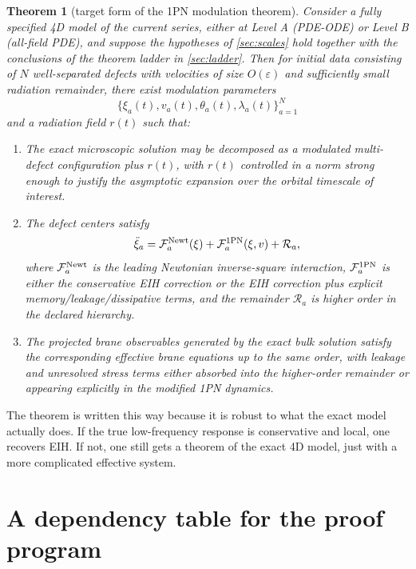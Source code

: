 \documentclass[11pt]{article}
\newcommand{\eps}{\varepsilon}
\newtheorem{theorem}{Theorem}
\begin{document}
\begin{theorem}[target form of the 1PN modulation theorem]
Consider a fully specified 4D model of the current series, either at Level A (PDE-ODE) or Level B (all-field PDE), and suppose the hypotheses of \cref{sec:scales} hold together with the conclusions of the theorem ladder in \cref{sec:ladder}. Then for initial data consisting of $N$ well-separated defects with velocities of size $O(\eps)$ and sufficiently small radiation remainder, there exist modulation parameters
\begin{equation}
  \{\xi_{a}(t),v_{a}(t),\theta_{a}(t),\lambda_{a}(t)\}_{a=1}^{N}
\end{equation}
and a radiation field $r(t)$ such that:
\begin{enumerate}[leftmargin=1.5em]
  \item The exact microscopic solution may be decomposed as a modulated multi-defect configuration plus $r(t)$, with $r(t)$ controlled in a norm strong enough to justify the asymptotic expansion over the orbital timescale of interest.
  \item The defect centers satisfy
  \begin{equation}
    \ddot\xi_{a}=\mathcal F^{\rm Newt}_{a}(\xi)+\mathcal F^{\rm 1PN}_{a}(\xi,v)+\mathcal R_{a},
  \end{equation}
  where $\mathcal F^{\rm Newt}_{a}$ is the leading Newtonian inverse-square interaction, $\mathcal F^{\rm 1PN}_{a}$ is either the conservative EIH correction or the EIH correction plus explicit memory/leakage/dissipative terms, and the remainder $\mathcal R_{a}$ is higher order in the declared hierarchy.
  \item The projected brane observables generated by the exact bulk solution satisfy the corresponding effective brane equations up to the same order, with leakage and unresolved stress terms either absorbed into the higher-order remainder or appearing explicitly in the modified 1PN dynamics.
\end{enumerate}
\end{theorem}

The theorem is written this way because it is robust to what the exact model actually does. If the true low-frequency response is conservative and local, one recovers EIH. If not, one still gets a theorem of the exact 4D model, just with a more complicated effective system.

\section{A dependency table for the proof program}
\label{sec:table}
\end{document}
